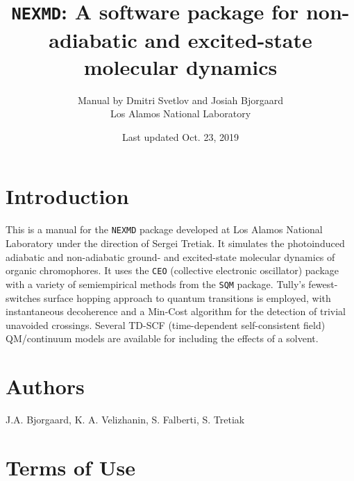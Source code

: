 \documentclass[12pt,letter,footinclude=true,headinclude=true,hyphens,oneside]{book} %
\begin{document}


\author{Manual by Dmitri Svetlov and Josiah Bjorgaard \\Los Alamos National Laboratory\\}
\date{Last updated Oct. 23, 2019}
\title{\texttt{NEXMD}: A software package for non-adiabatic and excited-state molecular dynamics}
	
	\maketitle
	
	\tableofcontents 


    
    \chapter{Introduction}
    
    This is a manual for the \texttt{NEXMD} package developed at Los Alamos National Laboratory under the direction of Sergei Tretiak. It simulates the photoinduced adiabatic and non-adiabatic ground- and excited-state molecular dynamics of organic chromophores. It uses the \texttt{CEO} (collective electronic oscillator) package with a variety of semiempirical methods from the \texttt{SQM} package. Tully's fewest-switches surface hopping approach to quantum transitions is employed, with instantaneous decoherence and a Min-Cost algorithm for the detection of trivial unavoided crossings. Several TD-SCF (time-dependent self-consistent field) QM/continuum models are available for including the effects of a solvent.
    
    \chapter{Authors}
    
    J.A. Bjorgaard, K. A. Velizhanin, S. Falberti, S. Tretiak
    
    \chapter{Terms of Use}
    
\end{document}
